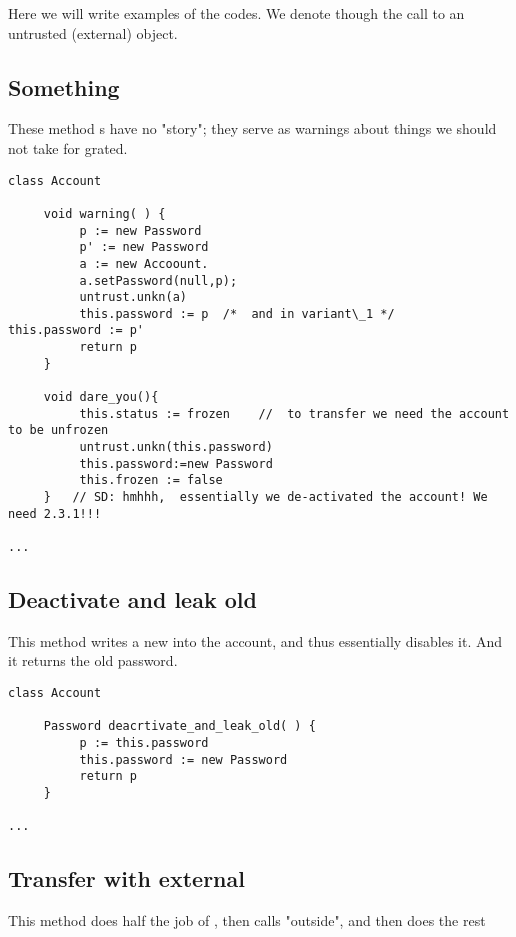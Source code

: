 
Here we will write examples of the codes. We denote though  the call to an untrusted (external) object.


\subsection{Something}

These  method s have no "story"; they serve  as warnings about things we should not take for grated.

\begin{lstlisting}[language=chainmail, mathescape=true, frame=lines]
class Account

     void warning( ) {
          p := new Password
          p' := new Password
          a := new Accoount.
          a.setPassword(null,p);
          untrust.unkn(a)
          this.password := p  /*  and in variant\_1 */     this.password := p' 
          return p    
     }
     
     void dare_you(){
          this.status := frozen    //  to transfer we need the account to be unfrozen 
          untrust.unkn(this.password)
          this.password:=new Password
          this.frozen := false
     }   // SD: hmhhh,  essentially we de-activated the account! We need 2.3.1!!!
     
...
\end{lstlisting}


\subsection*{Deactivate and leak old}

This method writes a new  into the account, and thus essentially disables it. And it returns the old password.

\begin{lstlisting}[language=chainmail, mathescape=true, frame=lines]
class Account

     Password deacrtivate_and_leak_old( ) {
          p := this.password
          this.password := new Password
          return p    
     }
     
...
\end{lstlisting}

\subsection{Transfer with external}

This method  does half the job of  , then calls "outside", and then does the rest

